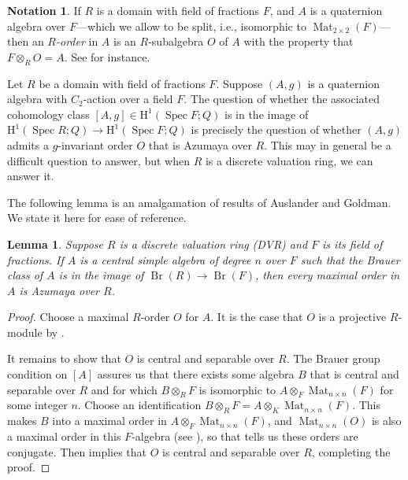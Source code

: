 \documentclass[reqno,oneside,dvipsnames,pdfnames,final]{amsart}
\newtheorem{lem}[thm]{Lemma}
\theoremstyle{definition}
\newtheorem{notn}[thm]{Notation}
\DeclareMathOperator{\Spec}{Spec}
\DeclareMathOperator{\Br}{Br}
\newcommand{\tensor}{\otimes}
\newcommand{\Hoh}{\mathrm{H}}
\newcommand{\Mat}{\operatorname{Mat}}
\begin{document}
\begin{notn}
  If $R$ is a domain with field of fractions $F$, and $A$ is a quaternion algebra over $F$---which we allow to be split, i.e., isomorphic to $\Mat_{2 \times 2}(F)$---then an \emph{$R$-order} in $A$ is an $R$-subalgebra $O$ of $A$ with the property that $F \tensor_R O = A$. See \cite[Ch.~10]{Voight2021} for instance.
\end{notn}

Let $R$ be a domain with field of fractions $F$. Suppose $(A,g)$ is a quaternion algebra with $C_2$-action over a field $F$. The question of whether the associated cohomology class $[A,g] \in \Hoh^1(\Spec F; Q)$ is in the image of $\Hoh^1(\Spec R; Q) \to \Hoh^1(\Spec F; Q)$ is precisely the question of whether $(A,g)$ admits a $g$-invariant order $O$ that is Azumaya over $R$. This may in general be a difficult question to answer, but when $R$ is a discrete valuation ring, we can answer it.


The following lemma is an amalgamation of results of Auslander and Goldman. We state it here for ease of reference.
\begin{lem} \label{lem:AusGold}
  Suppose $R$ is a discrete valuation ring (DVR) and $F$ is its field of fractions. If $A$ is a central simple algebra of degree $n$ over $F$ such that the Brauer class of $A$ is in the image of $\Br(R) \to \Br(F)$, then every maximal order in $A$ is Azumaya over $R$.
\end{lem}
\begin{proof}
  Choose a maximal $R$-order $O$ for $A$. It is the case that $O$ is a projective $R$-module by \cite[Prop.~1.3 and the Corollary to Prop.~4.7]{Auslander1960}. 
  
  It remains to show that $O$ is central and separable over $R$. The Brauer group condition on $[A]$ assures us that there exists some algebra $B$ that is central and separable over $R$ and for which $B \tensor_{R} F$ is isomorphic to $A \tensor_F \Mat_{n \times n}(F)$ for some integer $n$. Choose an identification $B \tensor_{R} F = A \tensor_K\Mat_{n \times n}(F)$. This makes $B$ into a maximal order in $A \tensor_F \Mat_{n \times n}(F)$, and $\Mat_{n \times n}(O)$ is also a maximal order in this $F$-algebra (see  \cite[Thm 3.6]{Auslander1960}), so that \cite[Prop.~3.5]{Auslander1960} tells us these orders are conjugate. Then \cite[Thm 3.5]{Auslander1960a} implies that $O$ is central and separable over $R$, completing the proof.
\end{proof}
\end{document}
